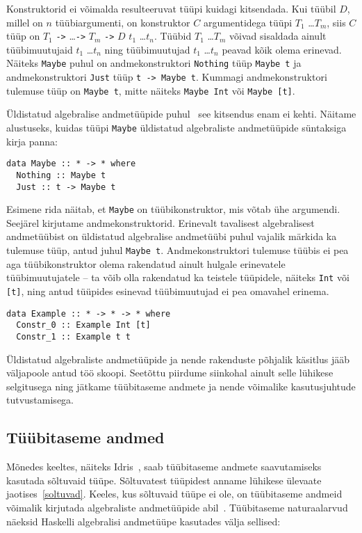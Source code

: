 \documentclass[12pt]{article}
\begin{document}
      Konstruktorid ei võimalda resulteeruvat tüüpi kuidagi kitsendada. Kui tüübil $D$, millel on $n$ tüübiargumenti, on konstruktor $C$ argumentidega tüüpi $T_1$ \ldots $T_m$, siis $C$ tüüp on $T_1$ \verb!->! \ldots \verb!->! $T_m$ \verb!->! $D$ $t_1$ \ldots $t_n$. Tüübid $T_1$ \ldots $T_m$ võivad sisaldada ainult tüübimuutujaid $t_1$ \ldots $t_n$ ning tüübimuutujad $t_1$ \ldots $t_n$ peavad kõik olema erinevad. Näiteks \verb!Maybe! puhul on andmekonstruktori \verb!Nothing! tüüp \verb!Maybe t! ja andmekonstruktori \verb!Just! tüüp \verb!t -> Maybe t!. Kummagi andmekonstruktori tulemuse tüüp on \verb!Maybe t!, mitte näiteks \verb!Maybe Int! või \verb!Maybe [t]!.

      Üldistatud algebralise andmetüüpide puhul~\cite{Fir} see kitsendus enam ei kehti. Näitame alustuseks, kuidas tüüpi \verb!Maybe! üldistatud algebraliste andmetüüpide süntaksiga kirja panna:

      \begin{verbatim}data Maybe :: * -> * where
  Nothing :: Maybe t
  Just :: t -> Maybe t\end{verbatim}

      Esimene rida näitab, et \verb!Maybe! on tüübikonstruktor, mis võtab ühe argumendi. Seejärel kirjutame andmekonstruktorid. Erinevalt tavalisest algebralisest andmetüübist on üldistatud algebralise andmetüübi puhul vajalik märkida ka tulemuse tüüp, antud juhul \verb!Maybe t!. Andmekonstruktori tulemuse tüübis ei pea aga tüübikonstruktor olema rakendatud ainult hulgale erinevatele tüübimuutujatele -- ta võib olla rakendatud ka teistele tüüpidele, näiteks \verb!Int! või \verb![t]!, ning antud tüüpides esinevad tüübimuutujad ei pea omavahel erinema.

      \begin{verbatim}data Example :: * -> * -> * where
  Constr_0 :: Example Int [t]
  Constr_1 :: Example t t\end{verbatim}

      Üldistatud algebraliste andmetüüpide ja nende rakenduste põhjalik käsitlus jääb väljapoole antud töö skoopi. Seetõttu piirdume siinkohal ainult selle lühikese selgitusega ning jätkame tüübitaseme andmete ja nende võimalike kasutusjuhtude tutvustamisega.
    \subsection{Tüübitaseme andmed}\label{tyybitasemeandmed}
      Mõnedes keeltes, näiteks Idris~\cite{The_Idr}, saab tüübitaseme andmete saavutamiseks kasutada sõltuvaid tüüpe. Sõltuvatest tüüpidest anname lühikese ülevaate jaotises~\ref{soltuvad}. Keeles, kus sõltuvaid tüüpe ei ole, on tüübitaseme andmeid võimalik kirjutada algebraliste andmetüüpide abil~\cite{Giv}. Tüübitaseme naturaalarvud näeksid Haskelli algebralisi andmetüüpe kasutades välja sellised:
\end{document}
